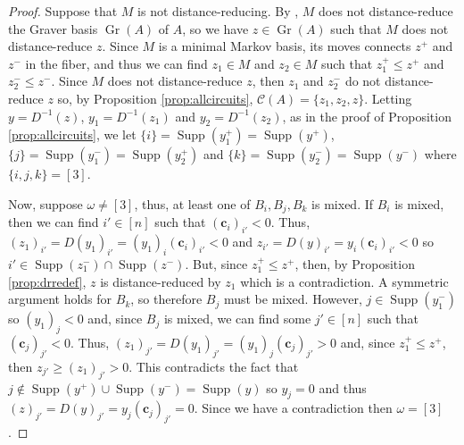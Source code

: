 \documentclass[a4paper, 12pt]{article}
\theoremstyle{plain}
\theoremstyle{definition}
\theoremstyle{remark}
\begin{document}
\begin{proof}
    Suppose that $M$ is not distance-reducing. By \cite[Theorem 7.4]{CK_2024}, $M$ does not distance-reduce the Graver basis $\operatorname{Gr}(A)$ of $A$, so we have $z \in \operatorname{Gr}(A)$ such that $M$ does not distance-reduce $z$. Since $M$ is a minimal Markov basis, its moves connects $z^+$ and $z^-$ in the fiber, and thus we can find $z_1 \in M$ and $z_2 \in M$ such that $z_1^+ \le z^+$ and $z_2^- \le z^-$. Since $M$ does not distance-reduce $z$, then $z_1$ and $z_2^-$ do not distance-reduce $z$ so, by Proposition \ref{prop:allcircuits}, $\mathcal{C}(A)=\{z_1,z_2,z\}$. Letting $y=D^{-1}(z)$, $y_1=D^{-1}(z_1)$ and $y_2=D^{-1}(z_2)$, as in the proof of Proposition \ref{prop:allcircuits}, we let $\{i\}=\operatorname{Supp}(y_1^+)=\operatorname{Supp}(y^+)$, $\{j\}=\operatorname{Supp}(y_1^-)=\operatorname{Supp}(y_2^+)$ and $\{k\}=\operatorname{Supp}(y_2^-)=\operatorname{Supp}(y^-)$ where $\{i,j,k\} =[3]$.

    Now, suppose $\omega \neq [3]$, thus, at least one of $B_i,B_j,B_k$ is mixed. If $B_i$ is mixed, then we can find $i' \in [n]$ such that $(\mathbf{c}_i)_{i'}<0$. Thus, $(z_1)_{i'}=D(y_1)_{i'}=(y_1)_i (\mathbf{c}_i)_{i'}<0$ and $z_{i'}=D(y)_{i'}=y_i (\mathbf{c}_i)_{i'}<0$ so $i' \in \operatorname{Supp}(z_1^-) \cap \operatorname{Supp}(z^-)$. But, since $z_1^+ \le z^+$, then, by Proposition \ref{prop:drredef}, $z$ is distance-reduced by $z_1$ which is a contradiction. A symmetric argument holds for $B_k$, so therefore $B_j$ must be mixed. However, $j \in \operatorname{Supp}(y_1^-)$ so $(y_1)_j<0$ and, since $B_j$ is mixed, we can find some $j' \in [n]$ such that $(\mathbf{c}_j)_{j'}<0$. Thus, $(z_1)_{j'}=D(y_1)_{j'}=(y_1)_j (\mathbf{c}_j)_{j'}>0$ and, since $z_1^+ \le z^+$, then $z_{j'} \ge (z_1)_{j'}>0$. This contradicts the fact that $j \not\in \operatorname{Supp}(y^+) \cup \operatorname{Supp}(y^-)= \operatorname{Supp}(y)$ so $y_j=0$ and thus $(z)_{j'}=D(y)_{j'}=y_j (\mathbf{c}_j)_{j'}=0$. Since we have a contradiction then $\omega =[3]$. 
    

\end{proof}
\end{document}
